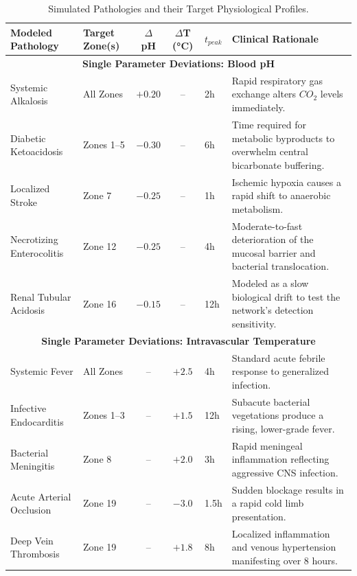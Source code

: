 \documentclass[sigconf]{acmart}
\begin{document}
\begin{table}[t]
    \centering
    \scriptsize
    \renewcommand{\arraystretch}{0.9}
    \setlength{\tabcolsep}{4pt}
    \caption{Simulated Pathologies and their Target Physiological Profiles.}
    \label{tab:disease_profiles}
    \begin{tabular}{@{} l l c c l p{8cm} @{}}
    \toprule
    \textbf{Modeled Pathology} & \textbf{Target Zone(s)} & \textbf{$\Delta$ pH} & \textbf{$\Delta$T (\si{\degreeCelsius})} & \textbf{$t_{peak}$} & \textbf{Clinical Rationale} \\
    \midrule
    \multicolumn{6}{c}{\textbf{Single Parameter Deviations: Blood pH}} \\
    \midrule
    Systemic Alkalosis & All Zones & $+0.20$ & -- & 2h & Rapid respiratory gas exchange alters $CO_2$ levels immediately. \\
    Diabetic Ketoacidosis & Zones 1--5 & $-0.30$ & -- & 6h & Time required for metabolic byproducts to overwhelm central bicarbonate buffering. \\
    Localized Stroke & Zone 7 & $-0.25$ & -- & 1h & Ischemic hypoxia causes a rapid shift to anaerobic metabolism. \\
    Necrotizing Enterocolitis & Zone 12 & $-0.25$ & -- & 4h & Moderate-to-fast deterioration of the mucosal barrier and bacterial translocation. \\
    Renal Tubular Acidosis & Zone 16 & $-0.15$ & -- & 12h & Modeled as a slow biological drift to test the network's detection sensitivity. \\
    \midrule
    \multicolumn{6}{c}{\textbf{Single Parameter Deviations: Intravascular Temperature}} \\
    \midrule
    Systemic Fever & All Zones & -- & $+2.5$ & 4h & Standard acute febrile response to generalized infection. \\
    Infective Endocarditis & Zones 1--3 & -- & $+1.5$ & 12h & Subacute bacterial vegetations produce a rising, lower-grade fever. \\
    Bacterial Meningitis & Zone 8 & -- & $+2.0$ & 3h & Rapid meningeal inflammation reflecting aggressive CNS infection. \\
    Acute Arterial Occlusion & Zone 19 & -- & $-3.0$ & 1.5h & Sudden blockage results in a rapid cold limb presentation. \\
    Deep Vein Thrombosis & Zone 19 & -- & $+1.8$ & 8h & Localized inflammation and venous hypertension manifesting over 8 hours. \\
    \midrule

\end{tabular}
\end{table}
\end{document}
